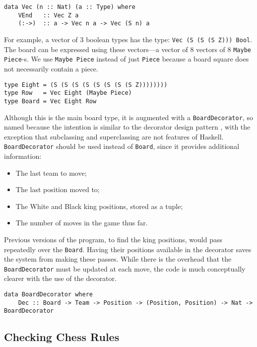 \documentclass[12pt, a4paper, bibliography=totocnumbered]{scrartcl}
\begin{document}
\begin{lstlisting}
data Vec (n :: Nat) (a :: Type) where
    VEnd   :: Vec Z a
    (:->)  :: a -> Vec n a -> Vec (S n) a
\end{lstlisting}

For example, a vector of 3 boolean types has the type: \lstinline{Vec (S (S (S Z))) Bool}. The board can be expressed using these vectors---a vector of 8 vectors of 8 \lstinline{Maybe Piece}-s. We use \lstinline{Maybe Piece} instead of just \lstinline{Piece} because a board square does not necessarily contain a piece.

\begin{lstlisting}
type Eight = (S (S (S (S (S (S (S (S Z))))))))
type Row   = Vec Eight (Maybe Piece)
type Board = Vec Eight Row
\end{lstlisting}

Although this is the main board type, it is augmented with a \lstinline{BoardDecorator}, so named because the intention is similar to the decorator design pattern \cite{decorator}, with the exception that subclassing and superclassing are not features of Haskell. \lstinline{BoardDecorator} should be used instead of \lstinline{Board}, since it provides additional information:

\begin{itemize}
    \item The last team to move;
    \item The last position moved to;
    \item The White and Black king positions, stored as a tuple;
    \item The number of moves in the game thus far.
\end{itemize}

Previous versions of the program, to find the king positions, would pass repeatedly over the \lstinline{Board}. Having their positions available in the decorator saves the system from making these passes. While there is the overhead that the \lstinline{BoardDecorator} must be updated at each move, the code is much conceptually clearer with the use of the decorator.

\begin{lstlisting}
data BoardDecorator where
    Dec :: Board -> Team -> Position -> (Position, Position) -> Nat -> BoardDecorator
\end{lstlisting}

\subsection{Checking Chess Rules}
\end{document}
